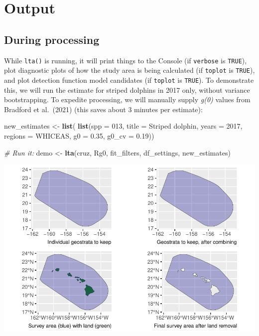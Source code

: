 \documentclass[
]{book}
\newenvironment{Shaded}{\begin{snugshade}}{\end{snugshade}}
\newcommand{\AttributeTok}[1]{\textcolor[rgb]{0.13,0.29,0.53}{#1}}
\newcommand{\CommentTok}[1]{\textcolor[rgb]{0.56,0.35,0.01}{\textit{#1}}}
\newcommand{\DecValTok}[1]{\textcolor[rgb]{0.00,0.00,0.81}{#1}}
\newcommand{\FloatTok}[1]{\textcolor[rgb]{0.00,0.00,0.81}{#1}}
\newcommand{\FunctionTok}[1]{\textcolor[rgb]{0.13,0.29,0.53}{\textbf{#1}}}
\newcommand{\NormalTok}[1]{#1}
\newcommand{\OtherTok}[1]{\textcolor[rgb]{0.56,0.35,0.01}{#1}}
\newcommand{\StringTok}[1]{\textcolor[rgb]{0.31,0.60,0.02}{#1}}
\begin{document}
\hypertarget{output}{%
\section*{Output}\label{output}}

\hypertarget{during-processing}{%
\subsection*{During processing}\label{during-processing}}

While \texttt{lta()} is running, it will print things to the Console (if \texttt{verbose} is \texttt{TRUE}), plot diagnostic plots of how the study area is being calculated (if \texttt{toplot} is \texttt{TRUE}), and plot detection function model candidates (if \texttt{toplot} is \texttt{TRUE}). To demonstrate this, we will run the estimate for striped dolphins in 2017 only, without variance bootstrapping. To expedite processing, we will manually supply \emph{g(0)} values from Bradford et al.~(2021) (this saves about 3 minutes per estimate):

\begin{Shaded}
\begin{Highlighting}[]
\NormalTok{new\_estimates }\OtherTok{\textless{}{-}} \FunctionTok{list}\NormalTok{(}
    \FunctionTok{list}\NormalTok{(}\AttributeTok{spp =} \StringTok{\textquotesingle{}013\textquotesingle{}}\NormalTok{,}
         \AttributeTok{title =} \StringTok{\textquotesingle{}Striped dolphin\textquotesingle{}}\NormalTok{,}
         \AttributeTok{years =} \DecValTok{2017}\NormalTok{,}
         \AttributeTok{regions =} \StringTok{\textquotesingle{}WHICEAS\textquotesingle{}}\NormalTok{,}
         \AttributeTok{g0 =} \FloatTok{0.35}\NormalTok{, }\AttributeTok{g0\_cv =} \FloatTok{0.19}\NormalTok{))}

\CommentTok{\# Run it:}
\NormalTok{demo }\OtherTok{\textless{}{-}} \FunctionTok{lta}\NormalTok{(cruz, Rg0, fit\_filters, df\_settings, new\_estimates)}
\end{Highlighting}
\end{Shaded}

\includegraphics{figures/unnamed-chunk-240-1.pdf}
\end{document}
